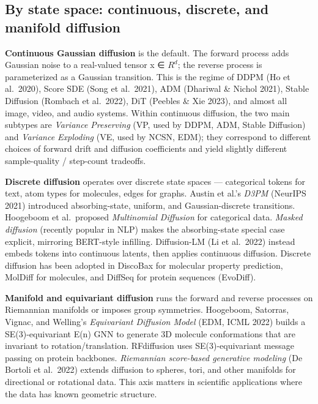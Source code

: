 \subsection{By state space: continuous, discrete, and manifold diffusion}\label{by-state-space-continuous-discrete-and-manifold-diffusion}

\textbf{Continuous Gaussian diffusion} is the default. The forward process adds Gaussian noise to a real-valued tensor x ∈ \(R^d\); the reverse process is parameterized as a Gaussian transition. This is the regime of DDPM (Ho et al.~2020), Score SDE (Song et al.~2021), ADM (Dhariwal \& Nichol 2021), Stable Diffusion (Rombach et al.~2022), DiT (Peebles \& Xie 2023), and almost all image, video, and audio systems. Within continuous diffusion, the two main subtypes are \emph{Variance Preserving} (VP, used by DDPM, ADM, Stable Diffusion) and \emph{Variance Exploding} (VE, used by NCSN, EDM); they correspond to different choices of forward drift and diffusion coefficients and yield slightly different sample-quality / step-count tradeoffs.

\textbf{Discrete diffusion} operates over discrete state spaces --- categorical tokens for text, atom types for molecules, edges for graphs. Austin et al.'s \emph{D3PM} (NeurIPS 2021) introduced absorbing-state, uniform, and Gaussian-discrete transitions. Hoogeboom et al.~proposed \emph{Multinomial Diffusion} for categorical data. \emph{Masked diffusion} (recently popular in NLP) makes the absorbing-state special case explicit, mirroring BERT-style infilling. Diffusion-LM (Li et al.~2022) instead embeds tokens into continuous latents, then applies continuous diffusion. Discrete diffusion has been adopted in DiscoBax for molecular property prediction, MolDiff for molecules, and DiffSeq for protein sequences (EvoDiff).

\textbf{Manifold and equivariant diffusion} runs the forward and reverse processes on Riemannian manifolds or imposes group symmetries. Hoogeboom, Satorras, Vignac, and Welling's \emph{Equivariant Diffusion Model} (EDM, ICML 2022) builds a SE(3)-equivariant E(n) GNN to generate 3D molecule conformations that are invariant to rotation/translation. RFdiffusion uses SE(3)-equivariant message passing on protein backbones. \emph{Riemannian score-based generative modeling} (De Bortoli et al.~2022) extends diffusion to spheres, tori, and other manifolds for directional or rotational data. This axis matters in scientific applications where the data has known geometric structure.

